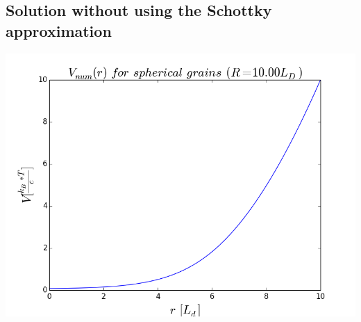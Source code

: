 \documentclass[10pt,a4paper]{article}
\begin{document}
\subsection{Solution without using the Schottky approximation}
\includegraphics[width=\textwidth]{png/numerical_10LD.png}






 
\end{document}
